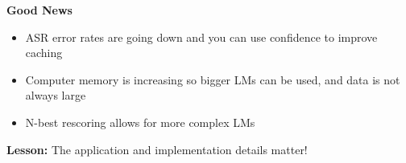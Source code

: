 \documentclass[11pt,titlepage]{article}
\begin{document}
{\bf Good News}
\begin{itemize}
\item ASR error rates are going down and you can use confidence to improve caching
\item Computer memory is increasing so bigger LMs can be used, and data is not always large
\item N-best rescoring allows for more complex LMs
\end{itemize}

{\bf Lesson:} The application and implementation details matter!
\end{document}
